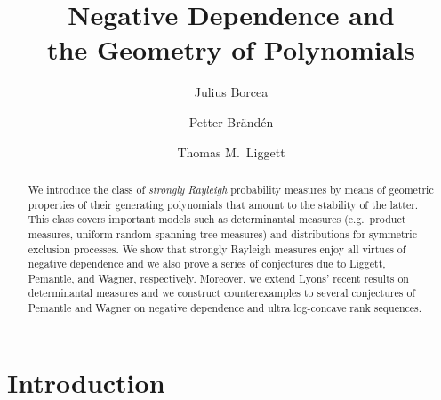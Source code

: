 \documentclass[10pt,reqno]{amsart}
\theoremstyle{plain}
\theoremstyle{definition}
\theoremstyle{remark}
\begin{document}
\title[Negative Dependence and the Geometry of Polynomials]{Negative 
Dependence and \\ the Geometry of Polynomials}

\author[J.~Borcea]{Julius Borcea}
\address{Department of Mathematics, Stockholm University, SE-106 91 Stockholm,
Sweden}

\author[P.~Br\"and\'en]{Petter Br\"and\'en}
\address{Department of Mathematics, Royal Institute of Technology, 
SE-100 44 Stockholm, Sweden}

\author[T.~M.~Liggett]{Thomas M.~Liggett}
\address{Department of Mathematics, University of California, Los Angeles, 
CA 90095-1555, USA}


\begin{abstract}
We introduce the class of {\em strongly Rayleigh} probability measures 
by means of geometric properties of their generating
polynomials that amount to the stability of the latter. This
class covers important models such as determinantal measures 
(e.g.~product measures, 
uniform random spanning tree measures) and 
distributions for symmetric exclusion processes. 
We show that strongly Rayleigh measures enjoy all virtues of negative 
dependence and we also prove a series of conjectures due to Liggett, Pemantle,
and Wagner, respectively. Moreover, we extend Lyons' recent results on 
determinantal measures and we construct counterexamples to
several conjectures of Pemantle and Wagner on negative dependence and 
ultra log-concave rank sequences.  
\end{abstract}

\maketitle

\tableofcontents

\section{Introduction}\label{s1}
\end{document}
